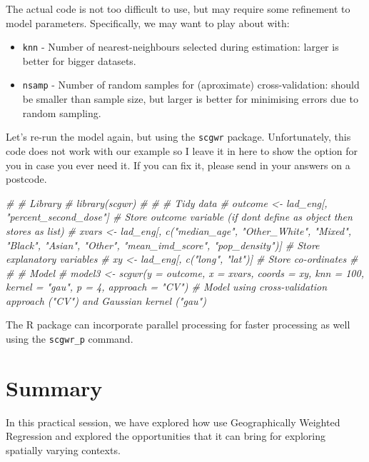 \documentclass[
]{book}
\newenvironment{Shaded}{\begin{snugshade}}{\end{snugshade}}
\newcommand{\CommentTok}[1]{\textcolor[rgb]{0.56,0.35,0.01}{\textit{#1}}}
\providecommand{\tightlist}{%
  \setlength{\itemsep}{0pt}\setlength{\parskip}{0pt}}
\begin{document}
The actual code is not too difficult to use, but may require some refinement to model parameters. Specifically, we may want to play about with:

\begin{itemize}
\tightlist
\item
  \texttt{knn} - Number of nearest-neighbours selected during estimation: larger is better for bigger datasets.
\item
  \texttt{nsamp} - Number of random samples for (aproximate) cross-validation: should be smaller than sample size, but larger is better for minimising errors due to random sampling.
\end{itemize}

Let's re-run the model again, but using the \texttt{scgwr} package. Unfortunately, this code does not work with our example so I leave it in here to show the option for you in case you ever need it. If you can fix it, please send in your answers on a postcode.

\begin{Shaded}
\begin{Highlighting}[]
\CommentTok{\# \# Library}
\CommentTok{\# library(scgwr)}
\CommentTok{\# }
\CommentTok{\# \# Tidy data}
\CommentTok{\# outcome \textless{}{-} lad\_eng[, "percent\_second\_dose"] \# Store outcome variable (if don\textquotesingle{}t define as object then stores as list)}
\CommentTok{\# xvars \textless{}{-} lad\_eng[, c("median\_age", "Other\_White", "Mixed", "Black", "Asian", "Other", "mean\_imd\_score", "pop\_density")] \# Store explanatory variables}
\CommentTok{\# xy \textless{}{-} lad\_eng[, c("long", "lat")] \# Store co{-}ordinates}
\CommentTok{\# }
\CommentTok{\# \# Model}
\CommentTok{\# model3 \textless{}{-} scgwr(y = outcome, x = xvars, coords = xy, knn = 100, kernel = "gau", p = 4, approach = "CV") \# Model using cross{-}validation approach ("CV") and Gaussian kernel ("gau")}
\end{Highlighting}
\end{Shaded}

The R package can incorporate parallel processing for faster processing as well using the \texttt{scgwr\_p} command.

\hypertarget{summary-3}{%
\section{Summary}\label{summary-3}}

In this practical session, we have explored how use Geographically Weighted Regression and explored the opportunities that it can bring for exploring spatially varying contexts.
\end{document}
